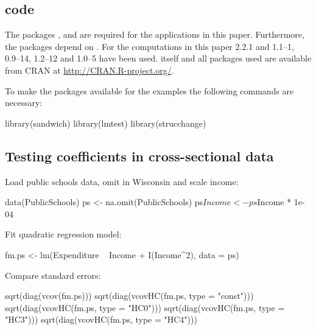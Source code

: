 \documentclass{Z}
\begin{document}
\begin{appendix}


\section[R code]{ code}

The packages ,  and  are
required for the applications in this paper. Furthermore, the packages
depend on . For the computations in this paper 
2.2.1 and 
1.1--1,
 0.9--14,
 1.2--12
and  1.0--5
have been used.  itself and all packages used are available from
CRAN at \url{http://CRAN.R-project.org/}.

To make the packages available for the examples the following commands are 
necessary:
\begin{Schunk}
\begin{Sinput}
  library(sandwich)
  library(lmtest)
  library(strucchange)
\end{Sinput}
\end{Schunk}

\subsection{Testing coefficients in cross-sectional data}

Load public schools data,
omit  in Wisconsin and scale income:
\begin{Schunk}
\begin{Sinput}
  data(PublicSchools)
  ps <- na.omit(PublicSchools)
  ps$Income <- ps$Income * 1e-04
\end{Sinput}
\end{Schunk}

Fit quadratic regression model:
\begin{Schunk}
\begin{Sinput}
  fm.ps <- lm(Expenditure ~ Income + I(Income^2), data = ps)
\end{Sinput}
\end{Schunk}

Compare standard errors:
\begin{Schunk}
\begin{Sinput}
  sqrt(diag(vcov(fm.ps)))
  sqrt(diag(vcovHC(fm.ps, type = "const")))
  sqrt(diag(vcovHC(fm.ps, type = "HC0")))
  sqrt(diag(vcovHC(fm.ps, type = "HC3")))
  sqrt(diag(vcovHC(fm.ps, type = "HC4")))
\end{Sinput}
\end{Schunk}


\end{appendix}
\end{document}
